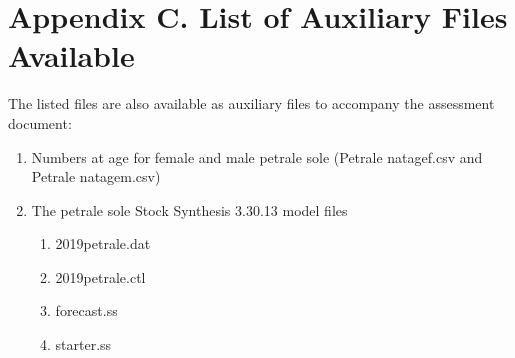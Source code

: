 \documentclass[12pt,]{article}
\begin{document}
\section{Appendix C. List of Auxiliary Files
Available}\label{appendix-c.-list-of-auxiliary-files-available}

The listed files are also available as auxiliary files to accompany the
assessment document:

\begin{enumerate}
  \item Numbers at age for female and male petrale sole (Petrale natagef.csv and Petrale natagem.csv)
  \item The petrale sole Stock Synthesis 3.30.13 model files
  
  \begin{enumerate}
    \item 2019petrale.dat
    \item 2019petrale.ctl
    \item forecast.ss
    \item starter.ss
  \end{enumerate}
\end{enumerate}

\newpage
\end{document}
